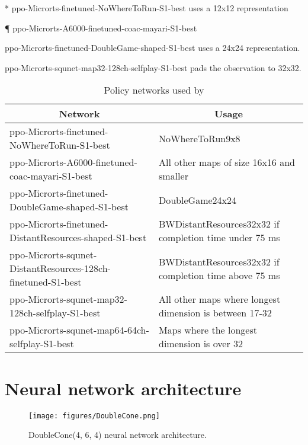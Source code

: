 \documentclass{article}
\begin{document}
\begin{table}[H]
\begin{threeparttable}
\begin{tablenotes}
                \item[*] ppo-Microrts-finetuned-NoWhereToRun-S1-best uses a 12x12
                representation
                \item[\P] ppo-Microrts-A6000-finetuned-coac-mayari-S1-best
                \item[\dag] ppo-Microrts-finetuned-DoubleGame-shaped-S1-best uses a 24x24
                    representation.
                \item[\ddag] ppo-Microrts-squnet-map32-128ch-selfplay-S1-best pads the
                    observation to 32x32.
            \end{tablenotes}
    \end{threeparttable}
\end{table}

\begin{table}[h]
    \caption{Policy networks used by \agentName}
    \label{tab:policy-networks}
    \begin{center}
        \begin{tabular}{|p{0.5\linewidth}|p{0.5\linewidth}|}
            \multicolumn{1}{c}{\bf Network}  &\multicolumn{1}{c}{\bf Usage} \\
            \hline
            ppo-Microrts-finetuned-NoWhereToRun-S1-best & NoWhereToRun9x8 \\ \hline
            ppo-Microrts-A6000-finetuned-coac-mayari-S1-best & All other maps of size 16x16 and smaller \\ \hline
            ppo-Microrts-finetuned-DoubleGame-shaped-S1-best & DoubleGame24x24 \\ \hline
            ppo-Microrts-finetuned-DistantResources-shaped-S1-best & BWDistantResources32x32 if completion time under 75 ms \\ \hline
            ppo-Microrts-squnet-DistantResources-128ch-finetuned-S1-best & BWDistantResources32x32 if completion time above 75 ms \\ \hline
            ppo-Microrts-squnet-map32-128ch-selfplay-S1-best & All other maps where longest dimension is between 17-32 \\ \hline
            ppo-Microrts-squnet-map64-64ch-selfplay-S1-best & Maps where the longest
            dimension is over 32 \\
            \hline
        \end{tabular}
    \end{center}
\end{table}

\section{Neural network architecture}
\begin{figure}[H]
    \begin{center}
        \texttt{[image: figures/DoubleCone.png]}
    \end{center}
    \caption{DoubleCone(4, 6, 4) neural network architecture.}
    \label{fig:doublecone}
\end{figure}
\end{document}
